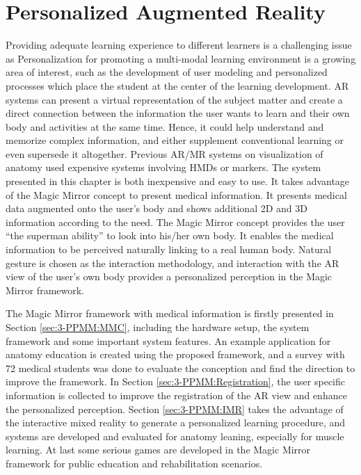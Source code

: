 
\chapter{Personalized Augmented Reality} \label{chaptor:3}
Providing adequate learning experience to different learners is a challenging issue as Personalization for promoting a multi-modal learning environment is a growing area of interest, such as the development of user modeling and personalized processes which place the student at the center of the learning development.
AR systems can present a virtual representation of the subject matter and create a direct connection between the information the user wants to learn and their own body and activities at the same time. Hence, it could help understand and memorize complex information, and either supplement conventional learning or even supersede it altogether. 
Previous AR/MR systems on visualization of anatomy used expensive systems involving HMDs or markers. The system presented in this chapter is both inexpensive and easy to use. It takes advantage of the Magic Mirror concept to present medical information. It presents medical data augmented onto the user's body and shows additional 2D and 3D information according to the need. The Magic Mirror concept provides the user ``the superman ability'' to look into his/her own body. It enables the medical information to be perceived naturally linking to a real human body. Natural gesture is chosen as the interaction methodology, and interaction with the AR view of the user's own body provides a personalized perception in the Magic Mirror framework.

The Magic Mirror framework with medical information is firstly presented in Section \ref{sec:3-PPMM:MMC}, including the hardware setup, the system framework and some important system features. An example application for anatomy education is created using the proposed framework, and a survey with 72  medical students was done to evaluate the conception and find the direction to improve the framework. In Section \ref{sec:3-PPMM:Registration}, the user specific information is collected to improve the registration of the AR view and enhance the personalized perception. Section \ref{sec:3-PPMM:IMR} takes the advantage of the interactive mixed reality to generate a personalized learning procedure, and systems are developed and evaluated for anatomy leaning, especially for muscle learning. At last some serious games are developed in the Magic Mirror framework for public education and rehabilitation scenarios.